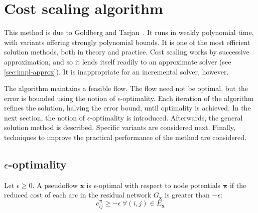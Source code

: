 \section{Cost scaling algorithm} \label{sec:impl-cost-scaling}

This method is due to Goldberg and Tarjan~\cite{Goldberg:1987}. It runs in weakly polynomial time, with variants offering strongly polynomial bounds. It is one of the most efficient solution methods, both in theory and practice\footnotemark. Cost scaling works by successive approximation, and so it lends itself readily to an approximate solver (see \cref{sec:impl-approx}). It is inappropriate for an incremental solver, however.

The algorithm maintains a feasible flow. The flow need not be optimal, but the error is bounded using the notion of $\epsilon$-optimality. Each iteration of the algorithm refines the solution, halving the error bound, until optimality is achieved. In the next section, the notion of $\epsilon$-optimality is introduced. Afterwards, the general solution method is described. Specific variants are considered next. Finally, techniques to improve the practical performance of the method are considered.

\subsection{\texorpdfstring{$\epsilon$}{epsilon}-optimality}

\begin{defn}
\label{defn:epsilon-optimality}
Let $\epsilon \geq 0$. A pseudoflow $\mathbf{x}$ is $\epsilon$-optimal with respect to node potentials $\boldsymbol{\pi}$ if the reduced cost of each arc in the residual network $G_\mathbf{x}$ is greater than $-\epsilon$:
\begin{equation} \label{eq:epsilon-optimality}
c^{\boldsymbol{\pi}}_{ij} \geq -\epsilon\:\forall (i,j) \in E_{\mathbf{x}}
\end{equation}
\end{defn}

